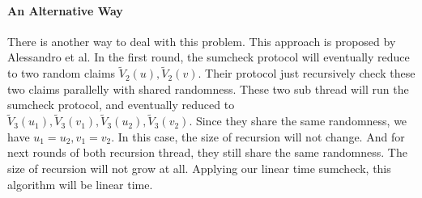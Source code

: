 \paragraph*{An Alternative Way}
There is another way to deal with this problem. This approach is proposed by Alessandro et al.\cite{zksumcheck} In the first round, the sumcheck protocol will eventually reduce to two random claims $\tilde{V}_{2}(u), \tilde{V}_2(v)$. Their protocol just recursively check these two claims parallelly with shared randomness. These two sub thread will run the sumcheck protocol, and eventually reduced to $\tilde{V}_{3}(u_1), \tilde{V}_{3}(v_1), \tilde{V}_{3}(u_2), \tilde{V}_{3}(v_2)$. Since they share the same randomness, we have $u_1=u_2, v_1=v_2$. In this case, the size of recursion will not change. And for next rounds of both recursion thread, they still share the same randomness. The size of recursion will not grow at all. Applying our linear time sumcheck, this algorithm will be linear time.